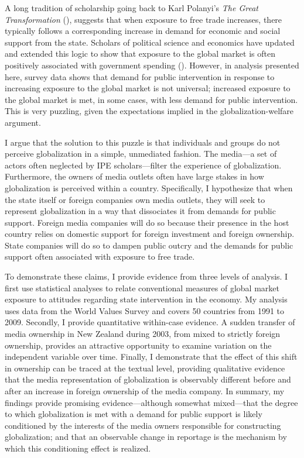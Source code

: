 \documentclass[12pt]{report}
\begin{document}
A long tradition of scholarship going back to Karl Polanyi's \emph{The Great Transformation} (\citeyear{Polanyi:2001vc}), suggests that when exposure to free trade increases, there typically follows a corresponding increase in demand for economic and social support from the state. Scholars of political science and economics have updated and extended this logic to show that exposure to the global market is often positively associated with government spending (\citealt{Adsera:2002vt, Cameron:1978vb, Garrett:1998wl,Rodrik:1998te}). However, in analysis presented here, survey data shows that demand for public intervention in response to increasing exposure to the global market is not universal; increased exposure to the global market is met, in some cases, with less demand for public intervention. This is very puzzling, given the expectations implied in the globalization-welfare argument.

	I argue that the solution to this puzzle is that individuals and groups do not perceive globalization in a simple, unmediated fashion. The media---a set of actors often neglected by IPE scholars---filter the experience of globalization. Furthermore, the owners of media outlets often have large stakes in how globalization is perceived within a country. Specifically, I hypothesize that when the state itself or foreign companies own media outlets, they will seek to represent globalization in a way that dissociates it from demands for public support. Foreign media companies will do so because their presence in the host country relies on domestic support for foreign investment and foreign ownership. State companies will do so to dampen public outcry and the demands for public support often associated with exposure to free trade.

	To demonstrate these claims, I provide evidence from three levels of analysis. I first use statistical analyses to relate conventional measures of global market exposure to attitudes regarding state intervention in the economy. My analysis uses data from the World Values Survey and covers 50 countries from 1991 to 2009. Secondly, I provide quantitative within-case evidence. A sudden transfer of media ownership in New Zealand during 2003, from mixed to strictly foreign ownership, provides an attractive opportunity to examine variation on the independent variable over time. Finally, I demonstrate that the effect of this shift in ownership can be traced at the textual level, providing qualitative evidence that the media representation of globalization is observably different before and after an increase in foreign ownership of the media company. In summary, my findings provide promising evidence---although somewhat mixed---that the degree to which globalization is met with a demand for public support is likely conditioned by the interests of the media owners responsible for constructing globalization; and that an observable change in reportage is the mechanism by which this conditioning effect is realized.
\end{document}
